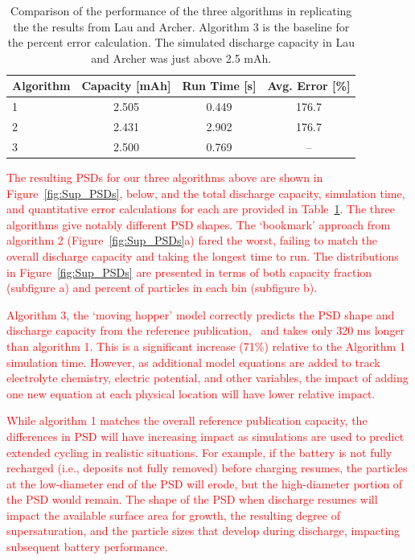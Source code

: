 \documentclass[12 pt]{article}    %
\begin{document}
\begin{table}[h!]
  \centering
  \caption{Comparison of the performance of the three algorithms in replicating the the results from Lau and Archer\cite{bib:Verify}. Algorithm 3 is the baseline for the percent error calculation. The simulated discharge capacity in Lau and Archer was just above 2.5 mAh.}
  \label{Table}
  \begin{tabular}{lccc}
  \toprule[1pt]\midrule[0.3pt]
      Algorithm & Capacity [mAh] & Run Time [s] & Avg. Error [\%] \\
      \midrule
       1   & 2.505 & 0.449  & 176.7\\
       2 & 2.431 & 2.902 & 176.7\\
       3 & 2.500 & 0.769 & -- \\ 
       \midrule[0.3pt]\bottomrule[1pt]
  \end{tabular}

\end{table}
 
\textcolor{red}{The resulting PSDs for our three algorithms above are shown in Figure~\ref{fig:Sup_PSDs}, below, and the total discharge capacity, simulation time, and quantitative error calculations for each are provided in Table~\ref{Table}. The three algorithms give notably different PSD shapes. The `bookmark' approach from algorithm 2 (Figure~\ref{fig:Sup_PSDs}a) fared the worst, failing to match the overall discharge capacity and taking the longest time to run.  The distributions in Figure~\ref{fig:Sup_PSDs} are presented in terms of both capacity fraction (subfigure a) and percent of particles in each bin (subfigure b).  }

\textcolor{red}{Algorithm 3, the `moving hopper' model correctly predicts the PSD shape and discharge capacity from the reference publication,~\cite{bib:Verify} and takes only 320 ms longer than algorithm 1. This is a significant increase (71\%) relative to the Algorithm 1 simulation time. However, as additional model equations are added to track electrolyte chemistry, electric potential, and other  variables, the impact of adding one new equation at each physical location will have lower relative impact.}

\textcolor{red}{While algorithm 1 matches the overall  reference publication capacity, the differences in PSD will have increasing impact as simulations are used to predict extended cycling in realistic situations. For example, if the battery is not fully recharged (i.e., deposits not fully removed) before charging resumes, the particles at the low-diameter end of the PSD will erode, but the high-diameter portion of the PSD would remain. The shape of the PSD when discharge resumes will impact the available surface area for growth, the resulting degree of supersaturation, and the particle sizes that develop during discharge, impacting subsequent battery performance.} \\ \\
\end{document}

